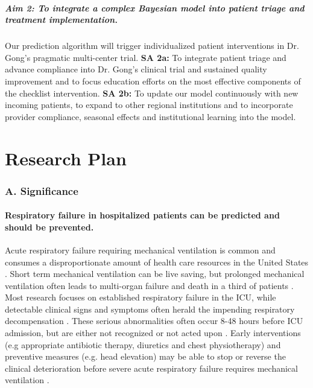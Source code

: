 \documentclass[11pt,notitlepage]{article}
\begin{document}
\subsubsection*{Aim 2: To integrate a complex Bayesian model into patient triage and treatment implementation.}
Our prediction algorithm will trigger individualized patient interventions in Dr. Gong's pragmatic multi-center trial. 
\newline \textbf{SA 2a:} To integrate patient triage and advance compliance into Dr. Gong's clinical trial and sustained quality improvement and to focus education efforts on the most effective components of the checklist intervention.
\newline \textbf{SA 2b:} To update our model continuously with new incoming patients, to expand to other regional institutions and to incorporate provider compliance, seasonal effects and institutional learning into the model.

\newpage
\part*{Research Plan}

\section*{A. Significance}

\subsection*{Respiratory failure in hospitalized patients can be predicted and should be prevented.}
Acute respiratory failure requiring mechanical ventilation is common and consumes a disproportionate amount of health care resources in the United States \cite{Wunsch_20639743}. Short term mechanical ventilation can be live saving, but prolonged mechanical ventilation often leads to multi-organ failure and death in a third of patients \cite{Wunsch_20639743, Ranieri_10872010}. Most research focuses on established respiratory failure in the ICU, while detectable clinical signs and symptoms often herald the impending respiratory decompensation \cite{Rohde_23401431}. These serious abnormalities often occur 8-48 hours before ICU admission, but are either not recognized or not acted upon \cite{Hillman_12415452,McQuillan_9632403}. Early interventions (e.g appropriate antibiotic therapy, diuretics and chest physiotherapy) and preventive measures (e.g. head elevation) may be able to stop or reverse the clinical deterioration before severe acute respiratory failure requires mechanical ventilation \cite{Naeem_16150531,Rivers_11794169,Rivers_12594312,Mitchell_20378235}. 
\end{document}
